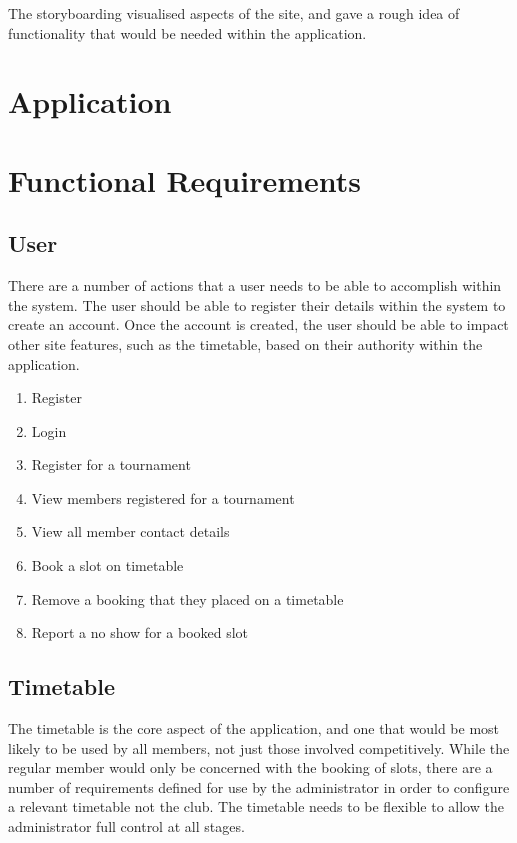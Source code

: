 The storyboarding visualised aspects of the site, and gave a rough idea of functionality that would be needed within the application. 

\section{Application}

\section{Functional Requirements}

\subsection{User} 

There are a number of actions that a user needs to be able to accomplish within the system. The user should be able to register their details within the system to create an account. Once the account is created, the user should be able to impact other site features, such as the timetable, based on their authority within the application. 

\begin{enumerate}
\item Register
\item Login
\item Register for a tournament
\item View members registered for a tournament
\item View all member contact details
\item Book a slot on timetable
\item Remove a booking that they placed on a timetable
\item Report a no show for a booked slot
\end{enumerate}

\subsection{Timetable}

The timetable is the core aspect of the application, and one that would be most likely to be used by all members, not just those involved competitively. While the regular member would only be concerned with the booking of slots, there are a number of requirements defined for use by the administrator in order to configure a relevant timetable not the club. The timetable needs to be flexible to allow the administrator full control at all stages.

